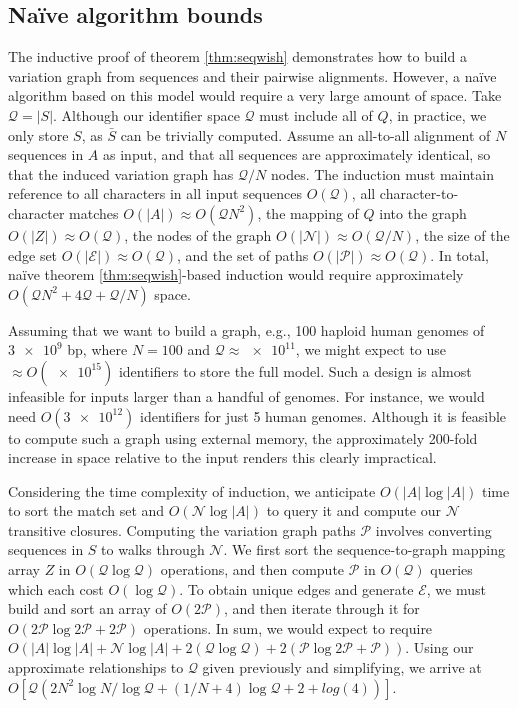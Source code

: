 \documentclass{bioinfo}
\theoremstyle{definition}
\begin{document}

\subsection{Na\"{i}ve algorithm bounds}
\label{sec:bounds}

The inductive proof of theorem \ref{thm:seqwish} demonstrates how to build a variation graph from sequences and their pairwise alignments.
However, a na\"{i}ve algorithm based on this model would require a very large amount of space.
Take $\mathcal{Q} = |S|$.
Although our identifier space $\mathcal{Q}$ must include all of $Q$, in practice, we only store $S$, as $\bar{S}$ can be trivially computed.
Assume an all-to-all alignment of $N$ sequences in $A$ as input, and that all sequences are approximately identical, so that the induced variation graph has $\mathcal{Q}/N$ nodes.
The induction must maintain reference to all characters in all input sequences $O(\mathcal{Q})$, all character-to-character matches $O(|A|) \approx O(\mathcal{Q}N^2)$, the mapping of $Q$ into the graph $O(|Z|) \approx O(\mathcal{Q})$, the nodes of the graph $O(|\mathcal{N}|) \approx O(\mathcal{Q}/N)$, the size of the edge set $O(|\mathcal{E}|) \approx O(\mathcal{Q})$, and the set of paths $O(|\mathcal{P}|) \approx O(\mathcal{Q})$.
In total, na\"{i}ve theorem \ref{thm:seqwish}-based induction would require approximately $O(\mathcal{Q}N^2 + 4\mathcal{Q} + \mathcal{Q}/N)$ space.

Assuming that we want to build a graph, e.g., 100 haploid human genomes of $\num{3e9}$ bp, where $N=100$ and $\mathcal{Q} \approx \num{e11}$, we might expect to use $\approx O(\num{e15})$ identifiers to store the full model.
Such a design is almost infeasible for inputs larger than a handful of genomes.
For instance, we would need $O(\num{3e12})$ identifiers for just 5 human genomes.
Although it is feasible to compute such a graph using external memory, the approximately 200-fold increase in space relative to the input renders this clearly impractical.

Considering the time complexity of induction, we anticipate $O(|A|\log|A|)$ time to sort the match set and $O(\mathcal{N} \log |A|)$ to query it and compute our $\mathcal{N}$ transitive closures.
Computing the variation graph paths $\mathcal{P}$ involves converting sequences in $S$ to walks through $\mathcal{N}$.
We first sort the sequence-to-graph mapping array $Z$ in $O(\mathcal{Q} \log \mathcal{Q})$ operations, and then compute $\mathcal{P}$ in $O(\mathcal{Q})$ queries which each cost $O(\log \mathcal{Q})$.
To obtain unique edges and generate $\mathcal{E}$, we must build and sort an array of $O(2\mathcal{P})$, and then iterate through it for $O(2\mathcal{P} \log 2\mathcal{P} + 2\mathcal{P})$ operations.
In sum, we would expect to require $O(|A|\log|A| + \mathcal{N} \log |A| + 2(\mathcal{Q} \log \mathcal{Q}) + 2(\mathcal{P} \log 2\mathcal{P} + \mathcal{P}))$.
Using our approximate relationships to $\mathcal{Q}$ given previously and simplifying, we arrive at $O[\mathcal{Q}(2N^2 \log N / \log \mathcal{Q} + (1/N + 4)\log \mathcal{Q} + 2 + log(4))]$.
\end{document}
